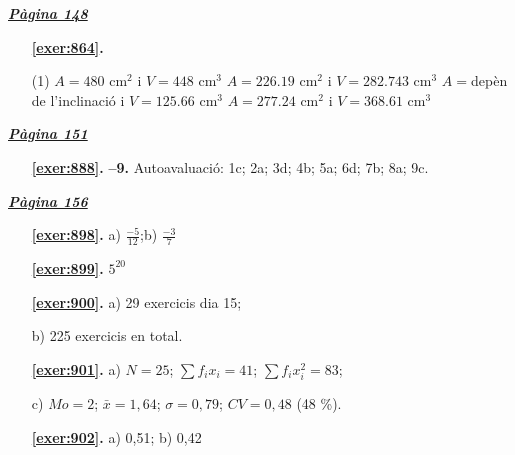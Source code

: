 
\hyperlink{page.148}{\textbf{\em Pàgina 148}}
\begin{enumerate}



 \item[\fontfamily{phv}\selectfont\color{blue}\textbf{\ref{exer:864}. }] \label{ans:864}
 \begin{tasks}[column-sep=1em, item-indent=1.3333em](1)
	 \task* $A=480$ cm$^2$ i $V=448$ cm$^3$
	 \task* $A=226.19$ cm$^2$ i $V=282.743$ cm$^3$
	 \task* $A=$depèn de l'inclinació i $V=125.66$ cm$^3$
	 \task* $A=277.24$ cm$^2$ i $V=368.61$ cm$^3$
\end{tasks}
 \end{enumerate}
\vspace{0.3cm}


\hyperlink{page.151}{\textbf{\em Pàgina 151}}
\begin{enumerate}
\item[\fontfamily{phv}\selectfont\color{blue}\textbf{\ref{exer:888}. }] \label{ans:888} 
\textbf {--9.} Autoavaluació: 1c; 2a; 3d; 4b; 5a; 6d; 7b; 8a; 9c.
 \end{enumerate}

 \vspace{1cm} 
 

\vspace{0.3cm}


\hyperlink{page.156}{\textbf{\em Pàgina 156}}
\begin{enumerate}
\item[\fontfamily{phv}\selectfont\color{blue}\textbf{\ref{exer:898}. }] \label{ans:898} 
 a) $\frac {-5}{12}$;\quad b) $\frac {-3}{7}$
 \end{enumerate}
\begin{enumerate}
\item[\fontfamily{phv}\selectfont\color{blue}\textbf{\ref{exer:899}. }] \label{ans:899} 
 $5^{20}$
\item[\fontfamily{phv}\selectfont\color{blue}\textbf{\ref{exer:900}. }] \label{ans:900} 
a) 29 exercicis dia 15; \par b) 225 exercicis en total.
\item[\fontfamily{phv}\selectfont\color{blue}\textbf{\ref{exer:901}. }] \label{ans:901} 
 a) $N=25$; $\sum f_i x_i = 41$; $\sum f_i x_i^2 =83$;\par c) $Mo=2$; $\bar x=1,64$; $\sigma =0,79$; $CV=0,48$ (48 \%).
\item[\fontfamily{phv}\selectfont\color{blue}\textbf{\ref{exer:902}. }] \label{ans:902} 
 a) 0,51; b) 0,42
 \end{enumerate}
\vspace{0.3cm}

